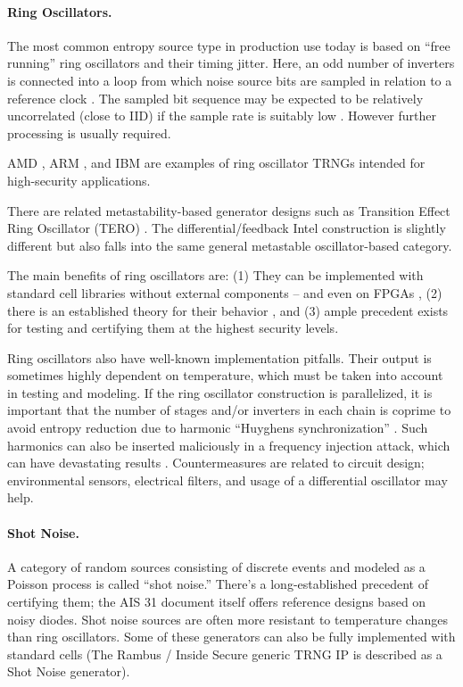     \paragraph{Ring Oscillators.}
    The most common entropy source type in production use today is
    based on ``free running'' ring oscillators and their timing jitter.
    Here, an odd number of inverters is connected into a loop from which
    noise source bits are sampled in relation to a reference clock
    \cite{BaLuMi+11}. The sampled bit sequence may be expected to be
    relatively uncorrelated (close to IID) if the sample rate is suitably low
    \cite{KiSc11}. However further processing is usually required.

    AMD \cite{AM17}, ARM \cite{AR17}, and IBM \cite{LiBaBo+13} are
    examples of ring oscillator TRNGs intended for high-security
    applications.

    There are related metastability-based generator designs such as
    Transition Effect Ring Oscillator (TERO) \cite{VaDr10}.
    The differential/feedback Intel construction \cite{HaKoMa12} is slightly
    different but also falls into the same general metastable
    oscillator-based category.

    The main benefits of ring oscillators are: (1) They can be implemented
    with standard cell libraries without external components --
    and even on FPGAs \cite{VaFiAu+10}, (2) there is an established theory
    for their behavior \cite{HaLe98,HaLiLe99,BaLuMi+11}, and (3) ample
    precedent exists for testing and certifying them at the highest security
    levels.

    Ring oscillators also have well-known implementation pitfalls.
    Their output is sometimes highly dependent on temperature,
    which must be taken into account in testing and modeling.
    If the ring oscillator construction is parallelized, it is important
    that the number of stages and/or inverters in each chain is coprime to
    avoid entropy reduction due to harmonic ``Huyghens synchronization''
    \cite{Ba86}.
    Such harmonics can also be inserted maliciously in a frequency
    injection attack, which can have devastating results \cite{MaMo09}.
    Countermeasures are related to circuit design; environmental sensors,
    electrical filters, and usage of a differential oscillator may help.

    \paragraph{Shot Noise.}
    A category of random sources consisting of discrete events
    and modeled as a Poisson process is called ``shot noise.''
    There's a long-established precedent of certifying them; the
    AIS 31 document \cite{KiSc11} itself offers reference designs based on
    noisy diodes. Shot noise sources are often more resistant to
    temperature changes than ring oscillators.
    Some of these generators can also be fully implemented with standard
    cells (The Rambus / Inside Secure generic TRNG IP \cite{Ra20} is described
    as a Shot Noise generator).

